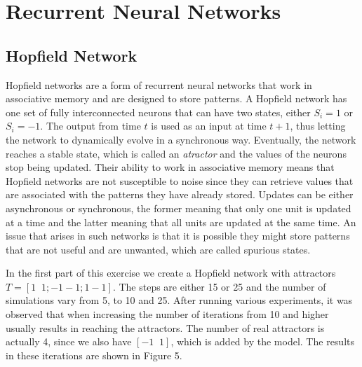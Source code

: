 \documentclass[11pt,conference,compsoc]{IEEEtran}
\begin{document}
\section{Recurrent Neural Networks}
\subsection{Hopfield Network}
Hopfield networks are a form of recurrent neural networks that work in associative memory and are designed to store patterns. A Hopfield network has one set of fully interconnected neurons that can have two states, either $S_i = 1$ or $S_i = -1$. The output from time $t$ is used as an input at time $t+1$, thus letting the network to dynamically evolve in a synchronous way. Eventually, the network reaches a stable state, which is called an \textit{atractor} and the values of the neurons stop being updated. Their ability to work in associative memory means that Hopfield networks are not susceptible to noise since they can retrieve values that are associated with the patterns they have already stored. Updates can be either asynchronous or synchronous, the former meaning that only one unit is updated at a time and the latter meaning that all units are updated at the same time. An issue that arises in such networks is that it is possible they might store patterns that are not useful and are unwanted, which are called spurious states. 

In the first part of this exercise we create a Hopfield network with attractors $T = [1\;\;1 ; -1-1 ; 1-1]$. The steps are either 15 or 25 and the number of simulations vary from 5, to 10 and 25. After running various experiments, it was observed that when increasing the number of iterations from 10 and higher usually results in reaching the attractors. The number of real attractors is actually 4, since we also have $[-1\;\; 1]$, which is added by the model. The results in these iterations are shown in Figure 5.
\end{document}
